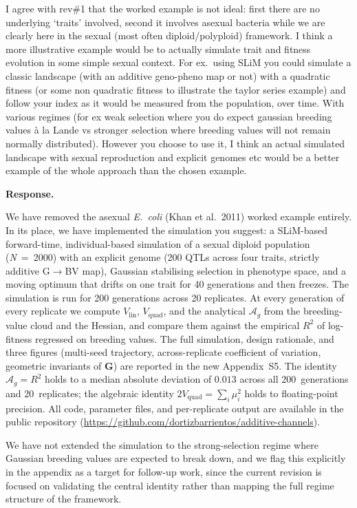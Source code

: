 \documentclass[11pt,a4paper]{article}
\newcommand{\response}{%
  \par\medskip\noindent\textbf{\color{ResponseColor}Response.}\quad\ignorespaces
}
\newcommand{\Ag}{\ensuremath{\mathcal{A}_{g}}\xspace}
\newcommand{\Vlin}{\ensuremath{V_{\mathrm{lin}}}\xspace}
\newcommand{\Vquad}{\ensuremath{V_{\mathrm{quad}}}\xspace}
\newcommand{\mat}[1]{\ensuremath{\mathbf{#1}}}
\begin{document}
\begin{edquote}
I agree with rev\#1 that the worked example is not ideal: first there are no underlying ‘traits’ involved, second it involves asexual bacteria while we are clearly here in the sexual (most often diploid/polyploid) framework. I think a more illustrative example would be to actually simulate trait and fitness evolution in some simple sexual context. For ex.\ using SLiM you could simulate a classic landscape (with an additive geno-pheno map or not) with a quadratic fitness (or some non quadratic fitness to illustrate the taylor series example) and follow your index as it would be measured from the population, over time. With various regimes (for ex weak selection where you do expect gaussian breeding values à la Lande vs stronger selection where breeding values will not remain normally distributed). However you choose to use it, I think an actual simulated landscape with sexual reproduction and explicit genomes etc would be a better example of the whole approach than the chosen example.
\end{edquote}

\response
We have removed the asexual \textit{E.~coli} (Khan et al.\ 2011) worked example entirely. In its place, we have implemented the simulation you suggest: a SLiM-based forward-time, individual-based simulation of a sexual diploid population (\textit{N}~=~2000) with an explicit genome (200 QTLs across four traits, strictly additive G$\to$BV map), Gaussian stabilising selection in phenotype space, and a moving optimum that drifts on one trait for 40 generations and then freezes. The simulation is run for 200 generations across 20 replicates. At every generation of every replicate we compute $\Vlin$, $\Vquad$, and the analytical $\Ag$ from the breeding-value cloud and the Hessian, and compare them against the empirical $R^2$ of log-fitness regressed on breeding values. The full simulation, design rationale, and three figures (multi-seed trajectory, across-replicate coefficient of variation, geometric invariants of $\mat{G}$) are reported in the new Appendix~S5. The identity $\Ag = R^2$ holds to a median absolute deviation of $0.013$ across all 200~generations and 20~replicates; the algebraic identity $2\Vquad = \sum_i \mu_i^2$ holds to floating-point precision. All code, parameter files, and per-replicate output are available in the public repository (\url{https://github.com/dortizbarrientos/additive-channels}).

We have not extended the simulation to the strong-selection regime where Gaussian breeding values are expected to break down, and we flag this explicitly in the appendix as a target for follow-up work, since the current revision is focused on validating the central identity rather than mapping the full regime structure of the framework.
\end{document}
